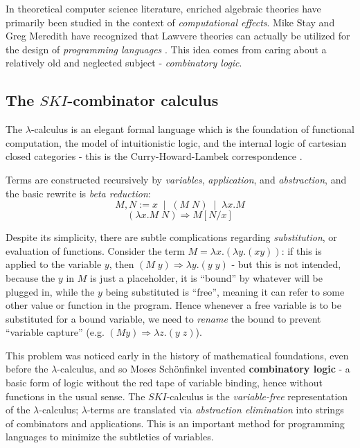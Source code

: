 \documentclass[a4paper,UKenglish]{article}
\theoremstyle{definition}
\begin{document}
In theoretical computer science literature, enriched algebraic theories have primarily been studied in the context of \textit{computational effects}. Mike Stay and Greg Meredith have recognized that Lawvere theories can actually be utilized for the design of \textit{programming languages} \cite{ladl}. This idea comes from caring about a relatively old and neglected subject - \textit{combinatory logic}.

\subsection{The $SKI$-combinator calculus}
The $\lambda$-calculus is an elegant formal language which is the foundation of functional computation, the model of intuitionistic logic, and the internal logic of cartesian closed categories - this is the Curry-Howard-Lambek correspondence \cite{rosetta}.

Terms are constructed recursively by \textit{variables}, \textit{application}, and \textit{abstraction}, and the basic rewrite is \textit{beta reduction}: $$M,N := x \;\; | \;\; (M\; N) \;\; | \;\; \lambda x.M$$ $$(\lambda x.M\; N) \Rightarrow M[N/x]$$

Despite its simplicity, there are subtle complications regarding \textit{substitution}, or evaluation of functions. Consider the term $M = \lambda x.(\lambda y.(xy))$: if this is applied to the variable $y$, then $(M\; y) \Rightarrow \lambda y.(y\; y)$ - but this is not intended, because the $y$ in $M$ is just a placeholder, it is ``bound'' by whatever will be plugged in, while the $y$ being substituted is ``free'', meaning it can refer to some other value or function in the program. Hence whenever a free variable is to be substituted for a bound variable, we need to \textit{rename} the bound to prevent ``variable capture'' (e.g. $(M y) \Rightarrow \lambda z.(y\; z)$).

This problem was noticed early in the history of mathematical foundations, even before the $\lambda$-calculus, and so Moses Sch\"onfinkel invented \textbf{combinatory logic} \cite{combs} - a basic form of logic without the red tape of variable binding, hence without functions in the usual sense. The $SKI$-calculus is the \textit{variable-free} representation of the $\lambda$-calculus; $\lambda$-terms are translated via \textit{abstraction elimination} into strings of combinators and applications. This is an important method for programming languages to minimize the subtleties of variables.
\end{document}
